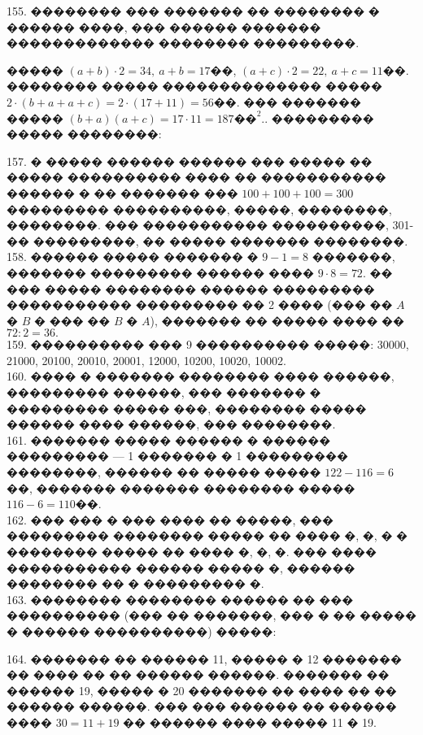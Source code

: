 \documentclass[12pt]{article}
\begin{document}
155. �������� ��� ������� �� �������� � ������ ����, ��� ������ ������� ������������� �������� ���������.
\begin{center}
\begin{figure}[ht!]
\end{figure}
\end{center}
����� $(a+b)\cdot2=34,\ a+b=17$��, $(a+c)\cdot2=22,\ a+c=11$��. �������� ����� �������������� ����� $2\cdot(b+a+a+c)=2\cdot(17+11)=56$��. ��� ������� ����� $(b+a)(a+c)=17\cdot11=187\text{��}^2.$\newpage{}. ��������� ����� ��������:
\begin{center}
\begin{figure}[ht!]
\end{figure}
\end{center}
157. � ����� ������ ������ ��� ����� �� ����� ���������� ���� �� ����������� ������ � �� ������� ��� $100+100+100=300$ ��������� ����������, �����, ��������, ��������. ��� ����������� ����������, 301-�� ���������, �� ����� ������� ��������.\\
158. ������ ����� ������� � $9-1=8$ �������, ������� ��������� ������ ���� $9\cdot8=72.$ �� ��� ����� �������� ������ ��������� ����������� ��������� �� 2 ���� (��� �� $A$ � $B$ � ��� �� $B$ � $A$), ������� �� ����� ���� �� $72:2=36.$\\
159. ���������� ��� 9 ���������� �����: 30000, 21000, 20100, 20010, 20001, 12000, 10200, 10020, 10002.\\
160. ���� � ������� �������� ���� ������, ��������� ������, ��� ������� � ��������� ����� ���, �������� ����� ������ ���� ������, ��� ��������.\\
161. ������� ����� ������ � ������ ��������� --- 1 ������� � 1 ��������� ��������, ������ �� ����� ����� $122-116=6$��, ������� ������� �������� ����� $116-6=110$��.\\
162. ��� ��� � ��� ���� �� �����, ��� ��������� �������� ����� �� ���� �, �, � � �������� ����� �� ���� �, �, �. ��� ���� ����������� ������ ����� �, ������ �������� �� � ��������� �.\\
163. �������� �������� ������ �� ��� ���������� (��� �� �������, ��� � �� ����� � ������ ����������) �����:
\begin{center}
\begin{figure}[ht!]
\end{figure}
\end{center}
164. ������� �� ������ 11, ����� � 12 ������� �� ���� �� �� ������ ������. ������� �� ������ 19, ����� � 20 ������� �� ���� �� �� ������ ������. ��� ��� ������ �� ������ ���� $30=11+19$ �� ������ ���� ����� 11 � 19.\\
\end{document}
